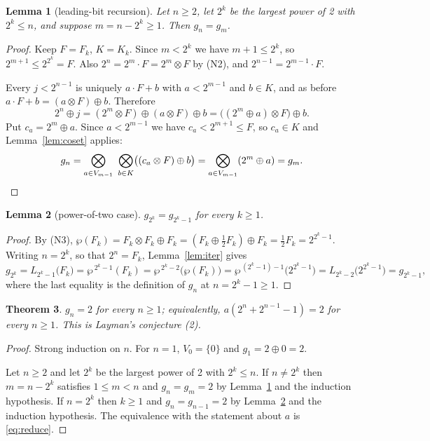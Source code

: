 \documentclass[11pt,a4paper]{article}
\theoremstyle{plain}
\newtheorem{theorem}{Theorem}
\newtheorem{lemma}[theorem]{Lemma}
\theoremstyle{definition}
\begin{document}
\begin{lemma}[leading-bit recursion]\label{lem:lead}
Let $n\ge2$, let $2^{k}$ be the largest power of 2 with $2^{k}\le n$, and suppose
$m=n-2^{k}\ge1$. Then $g_{n}=g_{m}$.
\end{lemma}

\begin{proof}
Keep $F=F_{k}$, $K=K_{k}$. Since $m<2^{k}$ we have $m+1\le2^{k}$, so
$2^{m+1}\le2^{2^{k}}=F$. Also $2^{n}=2^{m}\cdot F=2^{m}\otimes F$ by (N2), and
$2^{n-1}=2^{m-1}\cdot F$.

Every $j<2^{n-1}$ is uniquely $a\cdot F+b$ with $a<2^{m-1}$ and $b\in K$, and as before
$a\cdot F+b=(a\otimes F)\oplus b$. Therefore
\[
  2^{n}\oplus j=(2^{m}\otimes F)\oplus(a\otimes F)\oplus b
  =\bigl((2^{m}\oplus a)\otimes F\bigr)\oplus b.
\]
Put $c_{a}=2^{m}\oplus a$. Since $a<2^{m-1}$ we have $c_{a}<2^{m+1}\le F$, so $c_{a}\in K$
and Lemma~\ref{lem:coset} applies:
\[
  g_{n}=\bigotimes_{a\in V_{m-1}}\ \bigotimes_{b\in K}\bigl((c_{a}\otimes F)\oplus b\bigr)
      =\bigotimes_{a\in V_{m-1}}(2^{m}\oplus a)=g_{m}.\qedhere
\]
\end{proof}

\begin{lemma}[power-of-two case]\label{lem:pow}
$g_{2^{k}}=g_{2^{k}-1}$ for every $k\ge1$.
\end{lemma}

\begin{proof}
By (N3), $\wp(F_{k})=F_{k}\otimes F_{k}\oplus F_{k}=(F_{k}\oplus\tfrac12F_{k})\oplus F_{k}
=\tfrac12F_{k}=2^{2^{k}-1}$. Writing $n=2^{k}$, so that $2^{n}=F_{k}$,
Lemma~\ref{lem:iter} gives
\[
  g_{2^{k}}=L_{2^{k}-1}\bigl(F_{k}\bigr)=\wp^{\,2^{k}-1}(F_{k})
  =\wp^{\,2^{k}-2}\bigl(\wp(F_{k})\bigr)=\wp^{\,(2^{k}-1)-1}\bigl(2^{2^{k}-1}\bigr)
  =L_{2^{k}-2}\bigl(2^{2^{k}-1}\bigr)=g_{2^{k}-1},
\]
where the last equality is the definition of $g_{n}$ at $n=2^{k}-1\ge1$.
\end{proof}

\begin{theorem}\label{thm:main}
$g_{n}=2$ for every $n\ge1$; equivalently, $a(2^{n}+2^{n-1}-1)=2$ for every $n\ge1$. This
is Layman's conjecture (2).
\end{theorem}

\begin{proof}
Strong induction on $n$. For $n=1$, $V_{0}=\{0\}$ and $g_{1}=2\oplus0=2$.

Let $n\ge2$ and let $2^{k}$ be the largest power of 2 with $2^{k}\le n$. If $n\ne2^{k}$
then $m=n-2^{k}$ satisfies $1\le m<n$ and $g_{n}=g_{m}=2$ by Lemma~\ref{lem:lead} and the
induction hypothesis. If $n=2^{k}$ then $k\ge1$ and $g_{n}=g_{n-1}=2$ by
Lemma~\ref{lem:pow} and the induction hypothesis. The equivalence with the statement about
$a$ is \eqref{eq:reduce}.
\end{proof}
\end{document}
